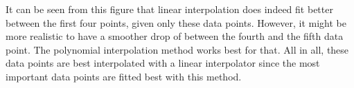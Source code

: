 It can be seen from this figure that linear interpolation does indeed fit better between the first four points, given only these data points. However, it might be more realistic to have a smoother drop of between the fourth and the fifth data point. The polynomial interpolation method works best for that. All in all, these data points are best interpolated with a linear interpolator since the most important data points are fitted best with this method.